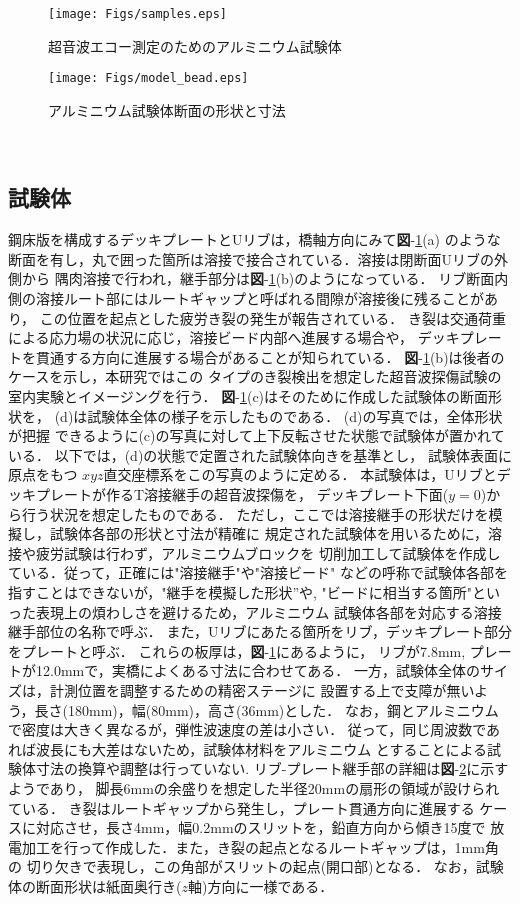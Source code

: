 \begin{figure}[thb]
\centering
	\texttt{[image: Figs/samples.eps]}
\caption{超音波エコー測定のためのアルミニウム試験体}
\label{fig:spec}
\end{figure}
\begin{figure}[htb]
\centering
	\texttt{[image: Figs/model\_bead.eps]}
	\caption{アルミニウム試験体断面の形状と寸法}
	\label{fig:model}
\end{figure}
﻿\subsection{試験体}
鋼床版を構成するデッキプレートとUリブは，橋軸方向にみて{\bf 図}-\ref{fig:spec}(a)
のような断面を有し，丸で囲った箇所は溶接で接合されている．溶接は閉断面Uリブの外側から
隅肉溶接で行われ，継手部分は{\bf 図}-\ref{fig:spec}(b)のようになっている．
リブ断面内側の溶接ルート部にはルートギャップと呼ばれる間隙が溶接後に残ることがあり，
この位置を起点とした疲労き裂の発生が報告されている\cite{Urib3}．
き裂は交通荷重による応力場の状況に応じ，溶接ビード内部へ進展する場合や，
デッキプレートを貫通する方向に進展する場合があることが知られている．
{\bf 図}-\ref{fig:spec}(b)は後者のケースを示し，本研究ではこの
タイプのき裂検出を想定した超音波探傷試験の室内実験とイメージングを行う．
{\bf 図}-\ref{fig:spec}(c)はそのために作成した試験体の断面形状を，
(d)は試験体全体の様子を示したものである． (d)の写真では，全体形状が把握
できるように(c)の写真に対して上下反転させた状態で試験体が置かれている．
以下では，(d)の状態で定置された試験体向きを基準とし， 試験体表面に原点をもつ
$xyz$直交座標系をこの写真のように定める． 
%
本試験体は，Uリブとデッキプレートが作るT溶接継手の超音波探傷を，
デッキプレート下面($y=0$)から行う状況を想定したものである．
ただし，ここでは溶接継手の形状だけを模擬し，試験体各部の形状と寸法が精確に
規定された試験体を用いるために，溶接や疲労試験は行わず，アルミニウムブロックを
切削加工して試験体を作成している．従って，正確には"溶接継手"や"溶接ビード"
などの呼称で試験体各部を指すことはできないが，"継手を模擬した形状”や,
"ビードに相当する箇所"といった表現上の煩わしさを避けるため，アルミニウム
試験体各部を対応する溶接継手部位の名称で呼ぶ．
また，Uリブにあたる箇所をリブ，デッキプレート部分をプレートと呼ぶ．
これらの板厚は，{\bf 図}-\ref{fig:spec}にあるように，
リブが7.8mm, プレートが12.0mmで，実橋によくある寸法に合わせてある．
一方，試験体全体のサイズは，計測位置を調整するための精密ステージに
設置する上で支障が無いよう，長さ(180mm)，幅(80mm)，高さ(36mm)とした．
なお，鋼とアルミニウムで密度は大きく異なるが，弾性波速度の差は小さい．
従って，同じ周波数であれば波長にも大差はないため，試験体材料をアルミニウム
とすることによる試験体寸法の換算や調整は行っていない.
リブ-プレート継手部の詳細は{\bf 図}-\ref{fig:model}に示すようであり，
脚長6mmの余盛りを想定した半径20mmの扇形の領域が設けられている．
き裂はルートギャップから発生し，プレート貫通方向に進展する
ケースに対応させ，長さ4mm，幅0.2mmのスリットを，鉛直方向から傾き15度で
放電加工を行って作成した．また，き裂の起点となるルートギャップは，1mm角の
切り欠きで表現し，この角部がスリットの起点(開口部)となる．
なお，試験体の断面形状は紙面奥行き($z$軸)方向に一様である．
